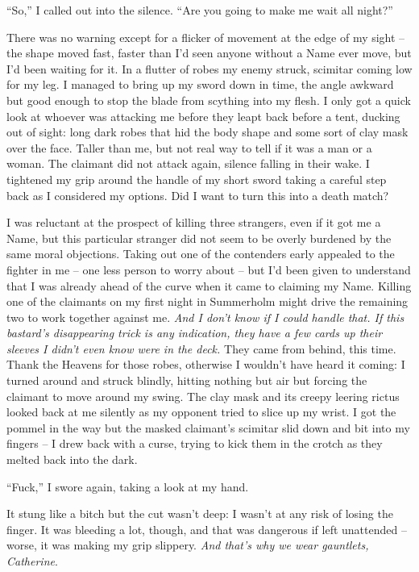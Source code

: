 \documentclass[12pt, openany]{book}
\begin{document}
“So,” I called out into the silence. “Are you going to make me wait all night?”

There was no warning except for a flicker of movement at the edge of my sight – the shape moved fast, faster than I’d seen anyone without a Name ever move, but I’d been waiting for it. In a flutter of robes my enemy struck, scimitar coming low for my leg. I managed to bring up my sword down in time, the angle awkward but good enough to stop the blade from scything into my flesh. I only got a quick look at whoever was attacking me before they leapt back before a tent, ducking out of sight: long dark robes that hid the body shape and some sort of clay mask over the face. Taller than me, but not real way to tell if it was a man or a woman. The claimant did not attack again, silence falling in their wake. I tightened my grip around the handle of my short sword taking a careful step back as I considered my options. Did I want to turn this into a death match?

I was reluctant at the prospect of killing three strangers, even if it got me a Name, but this particular stranger did not seem to be overly burdened by the same moral objections. Taking out one of the contenders early appealed to the fighter in me – one less person to worry about – but I’d been given to understand that I was already ahead of the curve when it came to claiming my Name. Killing one of the claimants on my first night in Summerholm might drive the remaining two to work together against me. \textit{And I don’t know if I could handle that. If this bastard’s disappearing trick is any indication, they have a few cards up their sleeves I didn’t even know were in the deck.} They came from behind, this time. Thank the Heavens for those robes, otherwise I wouldn’t have heard it coming: I turned around and struck blindly, hitting nothing but air but forcing the claimant to move around my swing. The clay mask and its creepy leering rictus looked back at me silently as my opponent tried to slice up my wrist. I got the pommel in the way but the masked claimant’s scimitar slid down and bit into my fingers – I drew back with a curse, trying to kick them in the crotch as they melted back into the dark.

“Fuck,” I swore again, taking a look at my hand.

It stung like a bitch but the cut wasn’t deep: I wasn’t at any risk of losing the finger. It was bleeding a lot, though, and that was dangerous if left unattended – worse, it was making my grip slippery. \textit{And that’s why we wear gauntlets, Catherine}.
\end{document}
